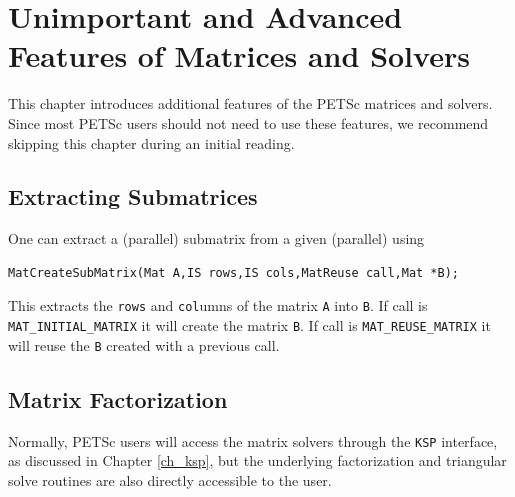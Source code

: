 {{{\cleardoublepage
\chapter{Unimportant and Advanced Features of Matrices and Solvers}
\label{ch_advanced}

This chapter introduces additional features of the PETSc matrices and solvers.
Since most PETSc users should not need to use these features,
we recommend skipping this chapter during an initial reading.

\medskip \medskip

\section{Extracting Submatrices} 

One can extract a (parallel) submatrix from a given (parallel) using
\begin{lstlisting}
MatCreateSubMatrix(Mat A,IS rows,IS cols,MatReuse call,Mat *B);
\end{lstlisting}
This extracts the \lstinline{rows} and \lstinline{col}umns of the matrix \lstinline{A} into \lstinline{B}. If
call is  \lstinline{MAT_INITIAL_MATRIX}  it will create the matrix
\lstinline{B}. If call is \lstinline{MAT_REUSE_MATRIX}  it will reuse the \lstinline{B}
created with a previous call.

\medskip \medskip

\section{Matrix Factorization} 
\label{sec_matfactor}

Normally, PETSc users will access the matrix solvers through the
\lstinline{KSP} interface, as discussed in Chapter \ref{ch_ksp}, but the underlying
factorization and triangular solve routines are also directly
accessible to the user.

\medskip \medskip

}}}
